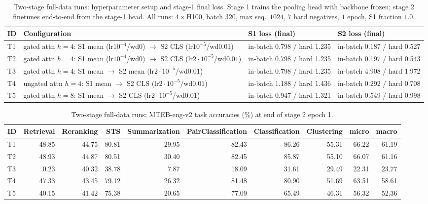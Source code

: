 
\begin{table}[ht]
\centering
\small
\setlength{\tabcolsep}{4pt}
\caption{Two-stage full-data runs: hyperparameter setup and stage-1 final loss. Stage 1 trains the pooling head with backbone frozen; stage 2 finetunes end-to-end from the stage-1 head. All runs: $4{\times}$H100, batch $320$, max seq.\ $1024$, $7$ hard negatives, $1$ epoch, S1 fraction $1.0$.}
\label{tab:s2-hparams}
\begin{tabular}{ll l l}
\toprule
ID & Configuration & S1 loss (final) & S2 loss (final) \\
\midrule
T1 & gated attn $h{=}4$: S1 mean (lr$10^{-4}$/wd$0$) $\to$ S2 CLS (lr$10^{-5}$/wd$0.01$) & in-batch 0.798 / hard 1.235 & in-batch 0.187 / hard 0.527 \\
T2 & gated attn $h{=}4$: S1 mean (lr$10^{-4}$/wd$0$) $\to$ S2 CLS (lr$2{\cdot}10^{-5}$/wd$0.01$) & in-batch 0.798 / hard 1.235 & in-batch 0.197 / hard 0.543 \\
T3 & gated attn $h{=}4$: S1 mean $\to$ S2 mean (lr$2{\cdot}10^{-5}$/wd$0.01$) & in-batch 0.798 / hard 1.235 & in-batch 4.908 / hard 1.972 \\
T4 & ungated attn $h{=}4$: S1 mean $\to$ S2 CLS (lr$2{\cdot}10^{-5}$/wd$0.01$) & in-batch 1.188 / hard 1.436 & in-batch 0.292 / hard 0.708 \\
T5 & gated attn $h{=}8$: S1 mean $\to$ S2 CLS (lr$2{\cdot}10^{-5}$/wd$0.01$) & in-batch 0.947 / hard 1.321 & in-batch 0.549 / hard 0.998 \\
\bottomrule
\end{tabular}
\end{table}

\begin{table}[ht]
\centering
\small
\setlength{\tabcolsep}{4pt}
\caption{Two-stage full-data runs: MTEB-eng-v2 task accuracies (\%) at end of stage 2 epoch 1.}
\label{tab:s2-perf}
\begin{tabular}{lrrrrrrrrr}
\toprule
ID & Retrieval & Reranking & STS & Summarization & PairClassification & Classification & Clustering & micro & macro \\
\midrule
T1 & 48.85 & 44.75 & 80.81 & 29.95 & 82.43 & 86.26 & 55.31 & 66.22 & 61.19 \\
T2 & 48.93 & 44.87 & 80.51 & 30.40 & 82.45 & 85.87 & 55.10 & 66.07 & 61.16 \\
T3 & 0.23 & 40.32 & 38.78 & 7.87 & 18.09 & 31.61 & 29.49 & 22.31 & 23.77 \\
T4 & 47.33 & 43.45 & 79.12 & 26.32 & 81.48 & 80.90 & 51.69 & 63.51 & 58.61 \\
T5 & 40.15 & 41.42 & 75.38 & 20.65 & 77.09 & 65.49 & 46.31 & 56.32 & 52.36 \\
\bottomrule
\end{tabular}
\end{table}


